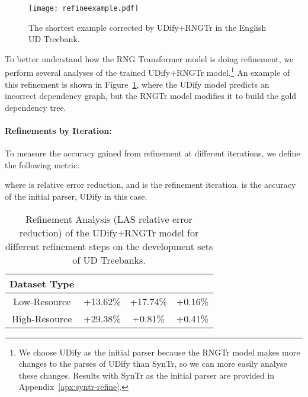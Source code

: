 \begin{figure}
\centering
  \texttt{[image: refineexample.pdf]}
  \caption{The shortest example corrected by UDify+RNGTr in the English UD Treebank.}
  \label{fig:refineexample}
\end{figure}

To better understand how the RNG Transformer model is doing refinement, we perform several analyses of the trained UDify+RNGTr model.\footnote{We choose UDify as the initial parser because the RNGTr model makes more changes to the parses of UDify than SynTr, so we can more easily analyse these changes. Results with SynTr as the initial parser are provided in Appendix~\ref{apx:syntr-refine}.}
An example of this refinement is shown in Figure~\ref{fig:refineexample}, where the UDify model predicts an incorrect dependency graph, but the RNGTr model modifies it to build the gold dependency tree.

\paragraph{Refinements by Iteration:}
To measure the accuracy gained from refinement at different iterations, we define the following metric:

where  is relative error reduction, and  is the refinement iteration.  is the accuracy of the initial parser, UDify in this case.

\begin{table}
\centering
  \begin{adjustbox}{width=\linewidth}
  
  \begin{tabular}{|c|c|c|c|}
    \hline
    Dataset Type &  &  &  \\
    \hline
     Low-Resource & +13.62\% & +17.74\%  & +0.16\% \\
     High-Resource & +29.38\% & +0.81\% & +0.41\% \\
     




\hline
    
    \end{tabular}
  \end{adjustbox}
\caption{Refinement Analysis (LAS relative error reduction) of the UDify+RNGTr model for different refinement steps on the development sets of UD Treebanks.}
\label{table:refine}
\end{table}

